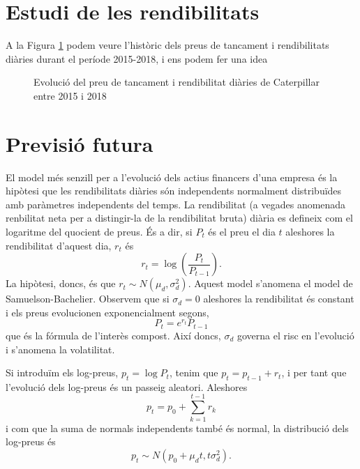 \documentclass{article}
\numberwithin{table}{section}
\numberwithin{figure}{section}
\numberwithin{equation}{section}
\begin{document}
\section{Estudi de les rendibilitats}
A la Figura \ref{fig:serie preus} podem veure l'històric dels preus de tancament i rendibilitats diàries durant el període 2015-2018, i ens podem fer una idea 





\begin{figure}[htb]
	\centering \sffamily \small
	
	\caption{Evolució del preu de tancament i rendibilitat diàries de Caterpillar entre 2015 i 2018}
	\label{fig:serie preus}
\end{figure}





\section{Previsió futura}

El model més senzill per a l'evolució dels actius financers d'una empresa és la hipòtesi que les rendibilitats diàries són independents normalment distribuïdes amb paràmetres independents del temps. La rendibilitat (a vegades anomenada renbilitat neta per a distingir-la de la rendibilitat bruta) diària es defineix com el logaritme del quocient de preus. És a dir, si \( P_t \) és el preu el dia \( t \) aleshores la rendibilitat d'aquest dia, \( r_t \) és
\begin{equation*}
	r_t = \log{\left(\frac{P_t}{P_{t-1}}\right)}.
\end{equation*}
La hipòtesi, doncs, és que \( r_t \sim N(\mu_d, \sigma_d^2) \). Aquest model s'anomena el model de Samuelson-Bachelier. Observem que si \( \sigma_d = 0 \) aleshores la rendibilitat és constant i els preus evolucionen exponencialment segons,
\begin{equation*}
	P_t = e^{r_t}P_{t-1}
\end{equation*}
que és la fórmula de l'interès compost. Així doncs, \( \sigma_d \) governa el risc en l'evolució i s'anomena la volatilitat. 

Si introduïm els log-preus, \( p_t = \log{P_t} \), tenim que \( p_t = p_{t-1} + r_t \), i per tant que l'evolució dels log-preus és un passeig aleatori. Aleshores
\begin{equation} \label{eqn:passeig aleatori}
	p_t = p_0 + \sum_{k = 1}^{t-1}r_k 
\end{equation}
i com que la suma de normals independents també és normal, la distribució dels log-preus és
\begin{equation} \label{eqn:distribucio log-preus}
	p_t \sim N(p_0 + \mu_d t, t\sigma_d^2).
\end{equation}
\end{document}
